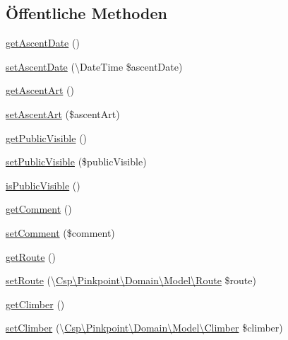 \subsection*{Öffentliche Methoden}
\begin{DoxyCompactItemize}
\item 
\hyperlink{classCsp_1_1Pinkpoint_1_1Domain_1_1Model_1_1Ascent_af1765b2f415a133cf2c1eb84b2207fb1}{get\+Ascent\+Date} ()
\item 
\hyperlink{classCsp_1_1Pinkpoint_1_1Domain_1_1Model_1_1Ascent_a26973093c8cdc7c355485a2272f36c41}{set\+Ascent\+Date} (\textbackslash{}Date\+Time \$ascent\+Date)
\item 
\hyperlink{classCsp_1_1Pinkpoint_1_1Domain_1_1Model_1_1Ascent_a0f9d1b317ddd1558b5854666ecd41282}{get\+Ascent\+Art} ()
\item 
\hyperlink{classCsp_1_1Pinkpoint_1_1Domain_1_1Model_1_1Ascent_a29e687dc499ea759d36a582ea90c3b8d}{set\+Ascent\+Art} (\$ascent\+Art)
\item 
\hyperlink{classCsp_1_1Pinkpoint_1_1Domain_1_1Model_1_1Ascent_a690e08b689a963616cf26b50a32979d1}{get\+Public\+Visible} ()
\item 
\hyperlink{classCsp_1_1Pinkpoint_1_1Domain_1_1Model_1_1Ascent_a30311e5a0059c54c05526ca532e66be3}{set\+Public\+Visible} (\$public\+Visible)
\item 
\hyperlink{classCsp_1_1Pinkpoint_1_1Domain_1_1Model_1_1Ascent_addf2680916c3708affb989f7e968c365}{is\+Public\+Visible} ()
\item 
\hyperlink{classCsp_1_1Pinkpoint_1_1Domain_1_1Model_1_1Ascent_acf3244c30d294c34584bebdd6758c644}{get\+Comment} ()
\item 
\hyperlink{classCsp_1_1Pinkpoint_1_1Domain_1_1Model_1_1Ascent_abf04371c42270fd67ae210329cebd533}{set\+Comment} (\$comment)
\item 
\hyperlink{classCsp_1_1Pinkpoint_1_1Domain_1_1Model_1_1Ascent_a2875281e703877565318163e001857ce}{get\+Route} ()
\item 
\hyperlink{classCsp_1_1Pinkpoint_1_1Domain_1_1Model_1_1Ascent_ab97d865275a2eb1181a8c02aaa719335}{set\+Route} (\textbackslash{}\hyperlink{classCsp_1_1Pinkpoint_1_1Domain_1_1Model_1_1Route}{Csp\textbackslash{}\+Pinkpoint\textbackslash{}\+Domain\textbackslash{}\+Model\textbackslash{}\+Route} \$route)
\item 
\hyperlink{classCsp_1_1Pinkpoint_1_1Domain_1_1Model_1_1Ascent_af34a53aa1a0986c08da6839faa959edf}{get\+Climber} ()
\item 
\hyperlink{classCsp_1_1Pinkpoint_1_1Domain_1_1Model_1_1Ascent_ae5b97790ca259d61a201128f3b0a197e}{set\+Climber} (\textbackslash{}\hyperlink{classCsp_1_1Pinkpoint_1_1Domain_1_1Model_1_1Climber}{Csp\textbackslash{}\+Pinkpoint\textbackslash{}\+Domain\textbackslash{}\+Model\textbackslash{}\+Climber} \$climber)
\end{DoxyCompactItemize}
